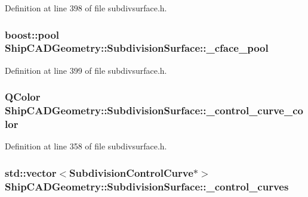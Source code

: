 Definition at line 398 of file subdivsurface.\-h.

\hypertarget{classShipCADGeometry_1_1SubdivisionSurface_a4adedb7d11b2317d0ce08c650dd2f2cf}{
\subsubsection[{\-\_\-cface\-\_\-pool}]{\setlength{\rightskip}{0pt plus 5cm}boost\-::pool Ship\-C\-A\-D\-Geometry\-::\-Subdivision\-Surface\-::\-\_\-cface\-\_\-pool\hspace{0.3cm}{\ttfamily [protected]}}}\label{classShipCADGeometry_1_1SubdivisionSurface_a4adedb7d11b2317d0ce08c650dd2f2cf}


Definition at line 399 of file subdivsurface.\-h.

\hypertarget{classShipCADGeometry_1_1SubdivisionSurface_a83328b441440e91ccd1793024020769c}{
\subsubsection[{\-\_\-control\-\_\-curve\-\_\-color}]{\setlength{\rightskip}{0pt plus 5cm}Q\-Color Ship\-C\-A\-D\-Geometry\-::\-Subdivision\-Surface\-::\-\_\-control\-\_\-curve\-\_\-color\hspace{0.3cm}{\ttfamily [protected]}}}\label{classShipCADGeometry_1_1SubdivisionSurface_a83328b441440e91ccd1793024020769c}


Definition at line 358 of file subdivsurface.\-h.

\hypertarget{classShipCADGeometry_1_1SubdivisionSurface_ae55f8fae758bd76dd3aaed737c61434c}{
\subsubsection[{\-\_\-control\-\_\-curves}]{\setlength{\rightskip}{0pt plus 5cm}std\-::vector$<${\bf Subdivision\-Control\-Curve}$\ast$$>$ Ship\-C\-A\-D\-Geometry\-::\-Subdivision\-Surface\-::\-\_\-control\-\_\-curves\hspace{0.3cm}{\ttfamily [protected]}}}\label{classShipCADGeometry_1_1SubdivisionSurface_ae55f8fae758bd76dd3aaed737c61434c}


